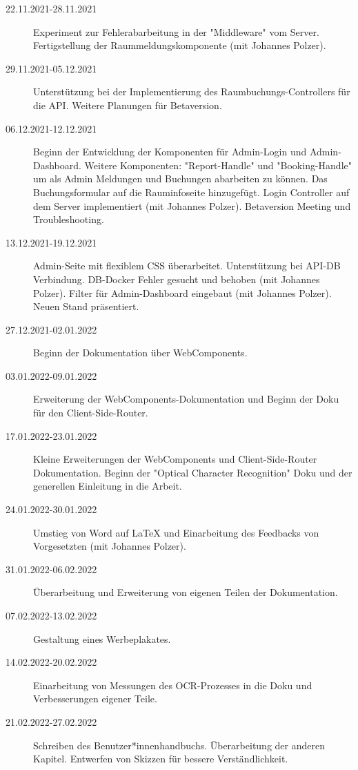 \begin{description}
    \item[22.11.2021-28.11.2021] Experiment zur Fehlerabarbeitung in der "Middleware" vom Server. Fertigstellung der Raummeldungskomponente (mit Johannes Polzer).
    \item[29.11.2021-05.12.2021] Unterstützung bei der Implementierung des Raumbuchungs-Controllers für die API. Weitere Planungen für Betaversion.
    \item[06.12.2021-12.12.2021] Beginn der Entwicklung der Komponenten für Admin-Login und Admin-Dashboard. Weitere Komponenten: "Report-Handle" und "Booking-Handle" um als Admin Meldungen und Buchungen abarbeiten zu können. Das Buchungsformular auf die Rauminfoseite hinzugefügt. Login Controller auf dem Server implementiert (mit Johannes Polzer). Betaversion Meeting und Troubleshooting.
    \item[13.12.2021-19.12.2021] Admin-Seite mit flexiblem CSS überarbeitet. Unterstützung bei API-DB Verbindung. DB-Docker Fehler gesucht und behoben (mit Johannes Polzer). Filter für Admin-Dashboard eingebaut (mit Johannes Polzer). Neuen Stand präsentiert.
    \item[27.12.2021-02.01.2022] Beginn der Dokumentation über WebComponents.
    \item[03.01.2022-09.01.2022] Erweiterung der WebComponents-Dokumentation und Beginn der Doku für den Client-Side-Router.
    \item[17.01.2022-23.01.2022] Kleine Erweiterungen der WebComponents und Client-Side-Router Dokumentation. Beginn der "Optical Character Recognition" Doku und der generellen Einleitung in die Arbeit. 
    \item[24.01.2022-30.01.2022] Umstieg von Word auf LaTeX und Einarbeitung des Feedbacks von Vorgesetzten (mit Johannes Polzer). 
    \item[31.01.2022-06.02.2022] Überarbeitung und Erweiterung von eigenen Teilen der Dokumentation. 
    \item[07.02.2022-13.02.2022] Gestaltung eines Werbeplakates.
    \item[14.02.2022-20.02.2022] Einarbeitung von Messungen des OCR-Prozesses in die Doku und Verbesserungen eigener Teile.
    \item[21.02.2022-27.02.2022] Schreiben des Benutzer*innenhandbuchs. Überarbeitung der anderen Kapitel. Entwerfen von Skizzen für bessere Verständlichkeit.
\end{description}